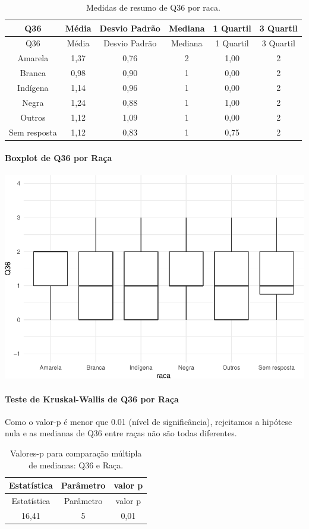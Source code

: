 \documentclass[]{article}
\let\oldparagraph\paragraph
\renewcommand{\paragraph}[1]{\oldparagraph{#1}\mbox{}}
\begin{document}
\begin{longtable}[]{@{}cccccc@{}}
\caption{\label{tab:unnamed-chunk-1344}Medidas de resumo de Q36 por raca.}\tabularnewline
\toprule
Q36 & Média & Desvio Padrão & Mediana & 1 Quartil & 3 Quartil\tabularnewline
\midrule
\endfirsthead
\toprule
Q36 & Média & Desvio Padrão & Mediana & 1 Quartil & 3 Quartil\tabularnewline
\midrule
\endhead
Amarela & 1,37 & 0,76 & 2 & 1,00 & 2\tabularnewline
Branca & 0,98 & 0,90 & 1 & 0,00 & 2\tabularnewline
Indígena & 1,14 & 0,96 & 1 & 0,00 & 2\tabularnewline
Negra & 1,24 & 0,88 & 1 & 1,00 & 2\tabularnewline
Outros & 1,12 & 1,09 & 1 & 0,00 & 2\tabularnewline
Sem resposta & 1,12 & 0,83 & 1 & 0,75 & 2\tabularnewline
\bottomrule
\end{longtable}

\hypertarget{boxplot-de-q36-por-rauxe7a}{%
\paragraph{Boxplot de Q36 por Raça}\label{boxplot-de-q36-por-rauxe7a}}

\begin{center}\includegraphics[width=0.75\linewidth]{relatorio_covid19_files/figure-latex/unnamed-chunk-1345-1} \end{center}

\hypertarget{teste-de-kruskal-wallis-de-q36-por-rauxe7a}{%
\paragraph{Teste de Kruskal-Wallis de Q36 por Raça}\label{teste-de-kruskal-wallis-de-q36-por-rauxe7a}}

Como o valor-p é menor que 0.01 (nível de significância), rejeitamos a hipótese nula e as medianas de Q36 entre raças não são todas diferentes.

\begin{longtable}[]{@{}ccc@{}}
\caption{\label{tab:unnamed-chunk-1347}Valores-p para comparação múltipla de medianas: Q36 e Raça.}\tabularnewline
\toprule
Estatística & Parâmetro & valor p\tabularnewline
\midrule
\endfirsthead
\toprule
Estatística & Parâmetro & valor p\tabularnewline
\midrule
\endhead
16,41 & 5 & 0,01\tabularnewline
\bottomrule
\end{longtable}
\end{document}
